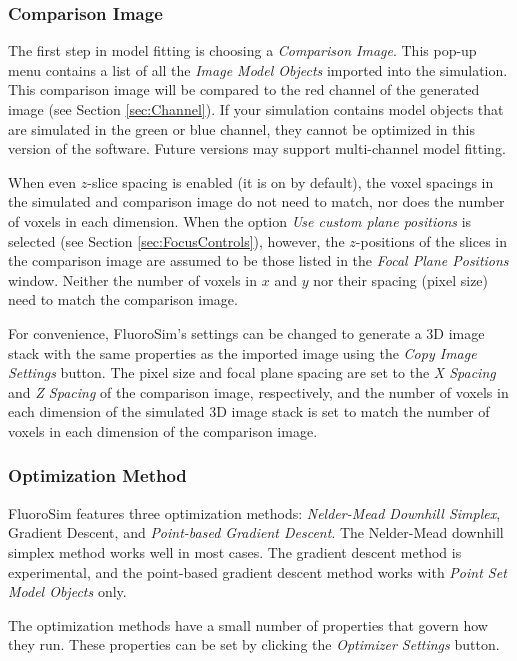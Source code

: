 \documentclass[11pt,titlepage,twoside]{article}
\begin{document}
\subsubsection{Comparison Image}

The first step in model fitting is choosing a \emph{Comparison Image}. This pop-up menu contains a list of all the \emph{Image Model Objects} imported into the simulation. This comparison image will be compared to the red channel of the generated image (see Section \ref{sec:Channel}). If your simulation contains model objects that are simulated in the green or blue channel, they cannot be optimized in this version of the software. Future versions may support multi-channel model fitting.

When even $z$-slice spacing is enabled (it is on by default), the voxel spacings in the simulated and comparison image do not need to match, nor does the number of voxels in each dimension. When the option \emph{Use custom plane positions} is selected (see Section \ref{sec:FocusControls}), however, the $z$-positions of the slices in the comparison image are assumed to be those listed in the \emph{Focal Plane Positions} window. Neither the number of voxels in $x$ and $y$ nor their spacing (pixel size) need to match the comparison image.

For convenience, FluoroSim's settings can be changed to generate a 3D image stack with the same properties as the imported image using the \emph{Copy Image Settings} button. The pixel size and focal plane spacing are set to the \emph{X Spacing} and \emph{Z Spacing} of the comparison image, respectively, and the number of voxels in each dimension of the simulated 3D image stack is set to match the number of voxels in each dimension of the comparison image.

\subsubsection{Optimization Method}

FluoroSim features three optimization methods: \emph{Nelder-Mead Downhill Simplex}, {Gradient Descent}, and \emph{Point-based Gradient Descent}. The Nelder-Mead downhill simplex method works well in most cases. The gradient descent method is experimental, and the point-based gradient descent method works with \emph{Point Set Model Objects} only.

The optimization methods have a small number of properties that govern how they run. These properties can be set by clicking the \emph{Optimizer Settings} button.
\end{document}
